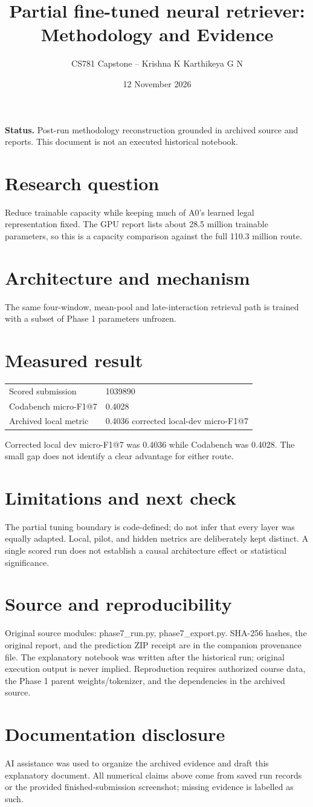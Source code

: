 \documentclass[11pt,a4paper]{article}
\title{Partial fine-tuned neural retriever: Methodology and Evidence}
\author{CS781 Capstone -- Krishna K Karthikeya G N}
\date{12 November 2026}
\begin{document}
\maketitle
\noindent\textbf{Status.} Post-run methodology reconstruction grounded in archived source and reports. This document is not an executed historical notebook.\par
\section*{Research question}
Reduce trainable capacity while keeping much of A0's learned legal representation fixed. The GPU report lists about 28.5 million trainable parameters, so this is a capacity comparison against the full 110.3 million route.
\section*{Architecture and mechanism}
The same four-window, mean-pool and late-interaction retrieval path is trained with a subset of Phase 1 parameters unfrozen.
\section*{Measured result}
\begin{center}\begin{tabular}{ll}Scored submission & 1039890\\
Codabench micro-F1@7 & 0.4028\\
Archived local metric & 0.4036 corrected local-dev micro-F1@7\end{tabular}\end{center}
Corrected local dev micro-F1@7 was 0.4036 while Codabench was 0.4028. The small gap does not identify a clear advantage for either route.
\section*{Limitations and next check}
The partial tuning boundary is code-defined; do not infer that every layer was equally adapted. Local, pilot, and hidden metrics are deliberately kept distinct. A single scored run does not establish a causal architecture effect or statistical significance.
\section*{Source and reproducibility}
Original source modules: phase7\_run.py, phase7\_export.py. SHA-256 hashes, the original report, and the prediction ZIP receipt are in the companion provenance file. The explanatory notebook was written after the historical run; original execution output is never implied. Reproduction requires authorized course data, the Phase 1 parent weights/tokenizer, and the dependencies in the archived source.
\section*{Documentation disclosure}
AI assistance was used to organize the archived evidence and draft this explanatory document. All numerical claims above come from saved run records or the provided finished-submission screenshot; missing evidence is labelled as such.
\end{document}

